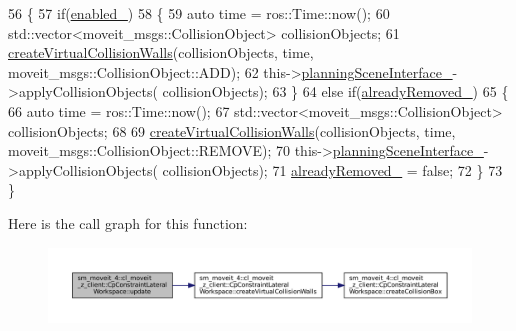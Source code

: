 \begin{DoxyCode}
56             \{
57                 \textcolor{keywordflow}{if}(\hyperlink{classsm__moveit__4_1_1cl__moveit__z__client_1_1CpConstraintLateralWorkspace_a869220e440aadc79cf5213b6d27c1217}{enabled\_})
58                 \{
59                     \textcolor{keyword}{auto} time = ros::Time::now();
60                     std::vector<moveit\_msgs::CollisionObject> collisionObjects;
61                     \hyperlink{classsm__moveit__4_1_1cl__moveit__z__client_1_1CpConstraintLateralWorkspace_abb413c4d73a4f6c7f2feca86624b5c7a}{createVirtualCollisionWalls}(collisionObjects, time, 
      moveit\_msgs::CollisionObject::ADD);
62                     this->\hyperlink{classsm__moveit__4_1_1cl__moveit__z__client_1_1CpConstraintLateralWorkspace_a39ac03e23023aef4e90f6bdd2ea41f75}{planningSceneInterface\_}->applyCollisionObjects(
      collisionObjects);
63                 \}
64                 \textcolor{keywordflow}{else} \textcolor{keywordflow}{if}(\hyperlink{classsm__moveit__4_1_1cl__moveit__z__client_1_1CpConstraintLateralWorkspace_a9d195448b13cc11a2043197ee4885e05}{alreadyRemoved\_})
65                 \{
66                     \textcolor{keyword}{auto} time = ros::Time::now();
67                     std::vector<moveit\_msgs::CollisionObject> collisionObjects;
68 
69                     \hyperlink{classsm__moveit__4_1_1cl__moveit__z__client_1_1CpConstraintLateralWorkspace_abb413c4d73a4f6c7f2feca86624b5c7a}{createVirtualCollisionWalls}(collisionObjects, time, 
      moveit\_msgs::CollisionObject::REMOVE);
70                     this->\hyperlink{classsm__moveit__4_1_1cl__moveit__z__client_1_1CpConstraintLateralWorkspace_a39ac03e23023aef4e90f6bdd2ea41f75}{planningSceneInterface\_}->applyCollisionObjects(
      collisionObjects);
71                     \hyperlink{classsm__moveit__4_1_1cl__moveit__z__client_1_1CpConstraintLateralWorkspace_a9d195448b13cc11a2043197ee4885e05}{alreadyRemoved\_} = \textcolor{keyword}{false};
72                 \}                
73             \}
\end{DoxyCode}
Here is the call graph for this function\+:
\nopagebreak
\begin{figure}[H]
\begin{center}
\leavevmode
\includegraphics[width=350pt]{classsm__moveit__4_1_1cl__moveit__z__client_1_1CpConstraintLateralWorkspace_a83138028b5fab59b84b9170c5df24a54_cgraph}
\end{center}
\end{figure}
